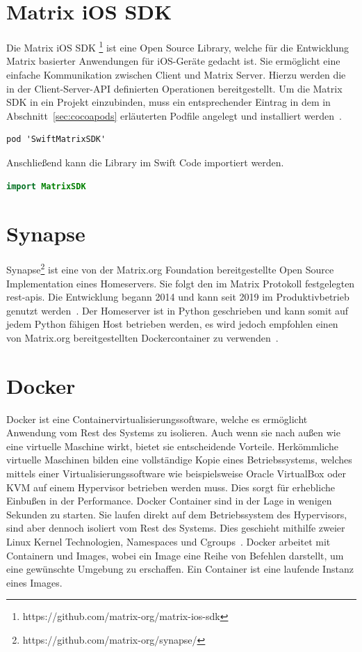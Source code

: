     \section{Matrix iOS SDK}\label{sec:matrix-sdk}
    Die Matrix iOS SDK \footnote{https://github.com/matrix-org/matrix-ios-sdk} ist eine Open Source Library, welche für die Entwicklung Matrix basierter Anwendungen für iOS-Geräte gedacht ist.
    Sie ermöglicht eine einfache Kommunikation zwischen Client und Matrix Server.
    Hierzu werden die in der Client-Server-API definierten Operationen bereitgestellt.
    Um die Matrix SDK in ein Projekt einzubinden, muss ein entsprechender Eintrag in dem in Abschnitt~\ref{sec:cocoapods} erläuterten Podfile angelegt und installiert werden~\cite{matrixiossdk}.
    \begin{lstlisting}[language={},label={lst:matrtix-sdk}]
        pod 'SwiftMatrixSDK'
    \end{lstlisting}
    Anschließend kann die Library im Swift Code importiert werden.
    \begin{lstlisting}[language=swift,label={lst:matrtix-sdk-swift}]
        import MatrixSDK
    \end{lstlisting}

    \section{Synapse}\label{sec:synapse}
    Synapse\footnote{https://github.com/matrix-org/synapse/} ist eine von der Matrix.org Foundation bereitgestellte Open Source Implementation eines Homeservers.
    Sie folgt den im Matrix Protokoll festgelegten \acs{rest}-\acsp{api}.
    Die Entwicklung begann 2014 und kann seit 2019 im Produktivbetrieb genutzt werden~\cite{synapse}.
    Der Homeserver ist in Python geschrieben und kann somit auf jedem Python fähigen Host betrieben werden, es wird jedoch empfohlen einen von Matrix.org bereitgestellten Dockercontainer zu verwenden~\cite{synapse2}.

    \section{Docker}\label{sec:docker}
    Docker ist eine Containervirtualisierungssoftware, welche es ermöglicht Anwendung vom Rest des Systems zu isolieren.
    Auch wenn sie nach außen wie eine virtuelle Maschine wirkt, bietet sie entscheidende Vorteile.
    Herkömmliche virtuelle Maschinen bilden eine vollständige Kopie eines Betriebssystems, welches mittels einer Virtualisierungssoftware wie beispielsweise Oracle VirtualBox oder KVM auf einem Hypervisor betrieben werden muss.
    Dies sorgt für erhebliche Einbußen in der Performance.
    Docker Container sind in der Lage in wenigen Sekunden zu starten.
    Sie laufen direkt auf dem Betriebssystem des Hypervisors, sind aber dennoch isoliert vom Rest des Systems.
    Dies geschieht mithilfe zweier Linux Kernel Technologien, Namespaces und Cgroups~\cite{docker}.
    Docker arbeitet mit Containern und Images, wobei ein Image eine Reihe von Befehlen darstellt, um eine gewünschte Umgebung zu erschaffen.
    Ein Container ist eine laufende Instanz eines Images.



